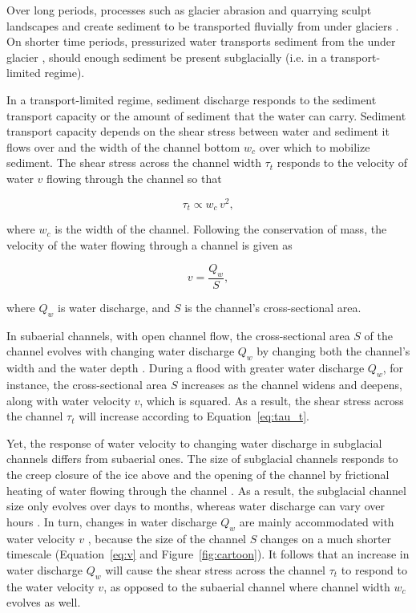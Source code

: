 \documentclass[11pt]{article}
\begin{document}
Over long periods, processes such as glacier abrasion and quarrying sculpt landscapes and create sediment to be transported fluvially from under glaciers \citep[c.f.][]{hallet1979,iverson2012,ugelvig2018}. 
On shorter time periods, pressurized water transports sediment from the under glacier \citep{walder1994,creyts2013,beaud2018}, should enough sediment be present subglacially (i.e. in a transport-limited regime).

In a transport-limited regime, sediment discharge responds to the sediment transport capacity or the amount of sediment that the water can carry.
Sediment transport capacity depends on the shear stress between water and sediment it flows  over \citep{shields1936,meyer1948,engelund1967} and the width of the channel bottom $w_c$ over which to mobilize sediment.
The shear stress  across the channel width $\tau_t$ responds to the velocity of water $v$ flowing through the channel so that 
\begin{linenomath*}
  \begin{equation}
    \label{eq:tau_t}
    \tau_t \propto w_c\, v^2,
  \end{equation}
\end{linenomath*}
% 
where $w_c$ is the width of the channel.
Following the conservation of mass, the velocity of the water flowing through a  channel is given as 
\begin{linenomath*}
  \begin{equation}
    \label{eq:v}
    v = \frac{Q_w}{S},
  \end{equation}
\end{linenomath*}
% 
where $Q_w$ is water discharge,  and $S$ is the channel's cross-sectional area.

In subaerial channels, with open channel flow, the cross-sectional area $S$ of the channel evolves with changing water discharge $Q_w$  by changing both the channel's width and the water depth \citep{leopold1953}.
During a flood with greater water discharge $Q_w$, for instance, the cross-sectional area $S$ increases as the channel widens and deepens, along with water velocity $v$, which is squared. As a result, the shear stress across the channel $\tau_t$ will increase according to Equation~\ref{eq:tau_t}. 

Yet, the response of water velocity to changing water discharge in subglacial channels differs from subaerial ones.
The size of subglacial channels responds to the creep closure of the ice above and the opening of the channel by frictional heating of water flowing through the channel \citep{rothlisberger1972}.
As a result, the subglacial channel size only evolves over days to months, whereas water discharge can vary over hours \citep[e.g.][]{iken1986,andrews2014,nanni2020}.
In turn, changes in water discharge $Q_w$ are mainly accommodated with water velocity $v$ \citep[e.g.][]{swift2005}, because the size of the channel $S$ changes on a much shorter timescale (Equation~\ref{eq:v} and Figure~\ref{fig:cartoon}).
It follows that an increase in water discharge $Q_w$ will cause the shear stress across the channel $\tau_t$ to respond to the water velocity $v$, as opposed to the subaerial channel where channel width $w_c$ evolves as well. 
\end{document}
